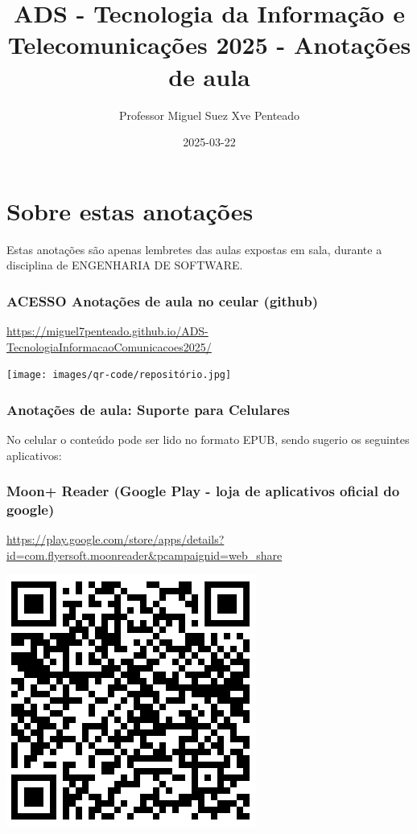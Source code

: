\documentclass[
]{book}
\title{ADS - Tecnologia da Informação e Telecomunicações 2025 - Anotações de aula}
\author{Professor Miguel Suez Xve Penteado}
\date{2025-03-22}
\begin{document}
\maketitle

{
\setcounter{tocdepth}{1}
\tableofcontents
}
\chapter*{Sobre estas anotações}\label{sobre-estas-anotauxe7uxf5es}

Estas anotações são apenas lembretes das aulas expostas em sala, durante a disciplina de ENGENHARIA DE SOFTWARE.

\subsection{ACESSO Anotações de aula no ceular (github)}\label{acesso-anotauxe7uxf5es-de-aula-no-ceular-github}

\url{https://miguel7penteado.github.io/ADS-TecnologiaInformacaoComunicacoes2025/}

\texttt{[image: images/qr-code/repositório.jpg]}

\subsection{Anotações de aula: Suporte para Celulares}\label{anotauxe7uxf5es-de-aula-suporte-para-celulares}

No celular o conteúdo pode ser lido no formato EPUB, sendo sugerio os seguintes aplicativos:

\subsection{\texorpdfstring{\textbf{Moon+ Reader (Google Play - loja de aplicativos oficial do google)}}{Moon+ Reader (Google Play - loja de aplicativos oficial do google)}}\label{moon-reader-google-play---loja-de-aplicativos-oficial-do-google}

\url{https://play.google.com/store/apps/details?id=com.flyersoft.moonreader&pcampaignid=web_share}

\includegraphics{images/qr-code/leitor_ebook/MoonReaderPlus.jpg}
\end{document}
